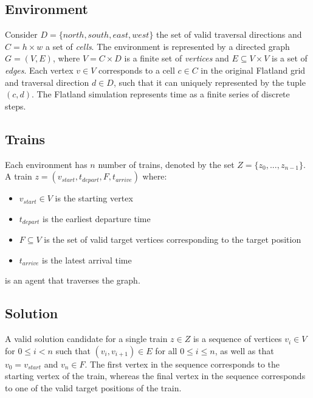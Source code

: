 \subsection{Environment}\label{sec:environment}
Consider $D = \{north,south,east,west\}$ the set of valid traversal directions and  $C = h \times w$ a set of \textit{cells}.
The environment is represented by a directed graph $G = (V,E)$, where $V = C \times D$ is a finite set of \textit{vertices} and $E \subseteq V \times V$ is a set of \textit{edges}.
Each vertex $v \in V$ corresponds to a cell $c \in C$ in the original Flatland grid and traversal direction $d \in D$, such that it can uniquely represented by the tuple $(c,d)$.
The Flatland simulation represents time as a finite series of discrete steps.



\subsection{Trains}\label{sec:trains}
Each environment has $n$ number of trains, denoted by the set $Z = \{z_0,...,z_{n-1}\}$.  A train $z = (v_{start}, t_{depart}, F, t_{arrive})$ where:
\begin{itemize}
	\item $v_{start} \in V$ is the starting vertex
	\item $t_{depart}$ is the earliest departure time
	\item $F \subseteq V$ is the set of valid target vertices corresponding to the target position
	\item $t_{arrive}$ is the latest arrival time
\end{itemize}

\noindent is an agent that traverses the graph.

\subsection{Solution}\label{sec:solution}
A valid solution candidate for a single train $z \in Z$ is a sequence of vertices $v_i \in V$ for $0 \leq i < n$ such that $(v_i,v_{i+1}) \in E$ for all $0 \leq i \leq n$, as well as that $v_{0} = v_{start}$ and $v_{n} \in F$.  
The first vertex in the sequence corresponds to the starting vertex of the train, whereas the final vertex in the sequence corresponds to one of the valid target positions of the train.


